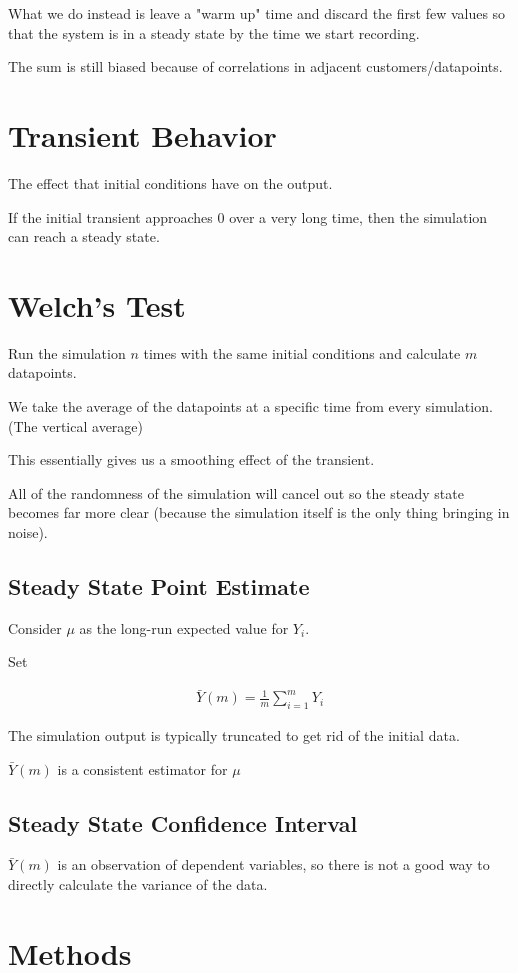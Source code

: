 \documentclass[fleqn]{report}
\newcommand{\equations} [1] {
\begin{gather*}
#1
\end{gather*}
}
\begin{document}
What we do instead is leave a "warm up" time and discard the first few 
values so that the system is in a steady state by the time we start recording. 

The sum is still biased because of correlations in adjacent customers/datapoints. 

\section{Transient Behavior}
The effect that initial conditions have on the output. 

If the initial transient approaches 0 over a very long time, then the 
simulation can reach a steady state. 

\section{Welch's Test}
Run the simulation $n$ times with the same initial conditions and calculate 
$m$ datapoints. 

We take the average of the datapoints at a specific time from every simulation. 
(The vertical average)

This essentially gives us a smoothing effect of the transient. 

All of the randomness of the simulation will cancel out so the steady 
state becomes far more clear (because the simulation itself is the only 
thing bringing in noise).

\subsection{Steady State Point Estimate}
Consider $\mu$ as the long-run expected value for $Y_i$. 

Set 
\equations{
    \bar{Y}(m) 
    =
    \frac{1}{m} 
    \sum_{i = 1}^{m} Y_i
}

The simulation output is typically truncated to get rid of the initial data. 

$\bar Y(m)$ is a consistent estimator for $\mu$ 

\subsection{Steady State Confidence Interval}
$\bar{Y}(m)$ is an observation of dependent variables, so there is not 
a good way to directly calculate the variance of the data. 

\section{Methods}
\end{document}

